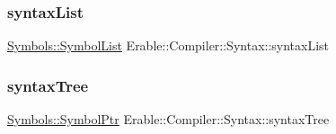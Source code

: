 \subsubsection{\texorpdfstring{syntaxList}{syntaxList}}
{\footnotesize\ttfamily \mbox{\hyperlink{namespace_erable_1_1_compiler_1_1_symbols_a63e8157d2f729d4689d27bacad42f8ed}{Symbols\+::\+Symbol\+List}} Erable\+::\+Compiler\+::\+Syntax\+::syntax\+List\hspace{0.3cm}{\ttfamily [inline]}}

\mbox{\label{namespace_erable_1_1_compiler_1_1_syntax_aecadb35dfe58c16e1f917013dd6bbb9d}} 
\subsubsection{\texorpdfstring{syntaxTree}{syntaxTree}}
{\footnotesize\ttfamily \mbox{\hyperlink{namespace_erable_1_1_compiler_1_1_symbols_a8f0bc762f448ea4d84e8713ab3e140b9}{Symbols\+::\+Symbol\+Ptr}} Erable\+::\+Compiler\+::\+Syntax\+::syntax\+Tree\hspace{0.3cm}{\ttfamily [inline]}}

